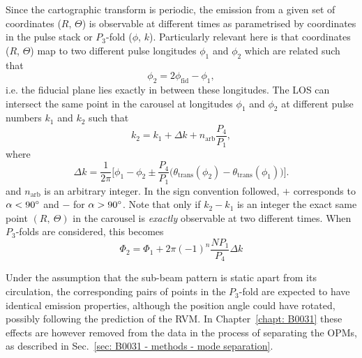 Since the cartographic transform is periodic, the emission from a given set of coordinates ($R$, $\Theta$) is observable at different times as parametrised by coordinates in the pulse stack or $P_3$-fold ($\phi$, $k$). Particularly relevant here is that coordinates ($R$, $\Theta$) map to two different pulse longitudes $\phi_1$ and $\phi_2$ which are related such that
\begin{equation}
    \label{eq: geometry derivations - opposite phi}
    \phi_2 = 2\phi_\mathrm{fid} - \phi_1,
\end{equation}
i.e. the fiducial plane lies exactly in between these longitudes. The LOS can intersect the same point in the carousel at longitudes $\phi_1$ and $\phi_2$ at different pulse numbers $k_1$ and $k_2$ such that
\begin{equation}
    \label{eq: geometry derivations - opposite k}
    k_2 = k_1 + \Delta k + n_\mathrm{arb}\frac{P_4}{P_1},
\end{equation}
where
\begin{equation}
    \label{eq: delta k stack}
    \Delta k = \frac{1}{2\pi}\bigg[\phi_1 - \phi_2 \pm \frac{P_4}{P_1}\Big(\theta_\mathrm{trans}(\phi_2) - \theta_\mathrm{trans}(\phi_1)\Big)\bigg].
\end{equation}
and $n_\mathrm{arb}$ is an arbitrary integer. In the sign convention followed, $+$ corresponds to $\alpha<90^\circ$ and $-$ for $\alpha > 90^\circ$. Note that only if $k_2 - k_1$ is an integer the exact same point $(R,\ \Theta)$ in the carousel is \textit{exactly} observable at two different times. When $P_3$-folds are considered, this becomes
\begin{equation}
    \label{eq: P3 fold phase}
    \Phi_2 = \Phi_1 + 2\pi(-1)^n\frac{ N P_1}{P_4}\Delta k
\end{equation}

Under the assumption that the sub-beam pattern is static apart from its circulation, the corresponding pairs of points in the $P_3$-fold are expected to have identical emission properties, although the position angle could have rotated, possibly following the prediction of the RVM. In Chapter~\ref{chapt: B0031} these effects are however removed from the data in the process of separating the OPMs, as described in Sec.~\ref{sec: B0031 - methods - mode separation}.

